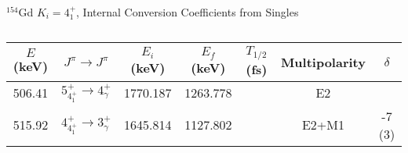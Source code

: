 \begin{table}
    \centering
    \caption{$^{154}$Gd $K_i=4^+_1$, Internal Conversion Coefficients from Singles}
    \label{tab:154Gd_Single_41_Disc}
\begin{ThreePartTable}
    \begin{subtable}{\textwidth}
        \caption{}
    \begin{tabular}{c|c|c|c|c|c|c}
        \toprule
        $E$ (keV)	&	$J^{\pi}	\rightarrow	J^{\pi}$	&	$E_i$ (keV)	&	$E_f$ (keV)	&	$T_{1/2}$ (fs)	&	Multipolarity	&	$\delta$\\
        \hline
        506.41	&	$5^+_{4^+_1}	\rightarrow	4^+_{\gamma}$	&	1770.187	&	1263.778	&		&	E2	&		\\
        \hline
        515.92	&	$4^+_{4^+_1}	\rightarrow	3^+_{\gamma}$	&	1645.814	&	1127.802	&		&	E2+M1	&	-7 (3)	\\
        \bottomrule
    \end{tabular}
    \end{subtable}
    \end{ThreePartTable}
\end{table}
